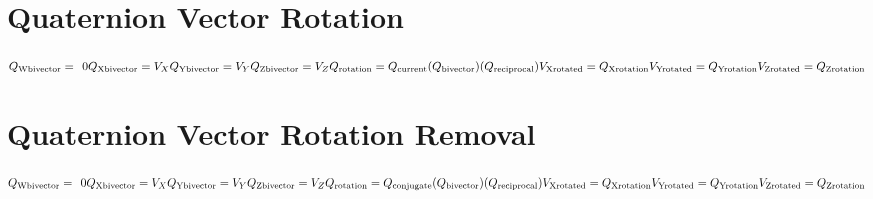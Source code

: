 \documentclass{article}
\begin{document}
\section{Quaternion Vector Rotation}
\begin{linenomath}
\begin{center}
$
Q_\textrm{Wbivector} =\hspace{1ex} 0 \newline
Q_\textrm{Xbivector} = V_X \newline
Q_\textrm{Ybivector} = V_Y \newline
Q_\textrm{Zbivector} = V_Z \newline
\newline
Q_\textrm{rotation} = Q_\textrm{current}(Q_\textrm{bivector})(Q_\textrm{reciprocal}) \newline
\newline
V_\textrm{Xrotated} = Q_\textrm{Xrotation} \newline
V_\textrm{Yrotated} = Q_\textrm{Yrotation} \newline
V_\textrm{Zrotated} = Q_\textrm{Zrotation} \newline
$
\end{center}
\end{linenomath}


\section{Quaternion Vector Rotation Removal}
\begin{linenomath}
\begin{center}
$
Q_\textrm{Wbivector} =\hspace{1ex} 0 \newline
Q_\textrm{Xbivector} = V_X \newline
Q_\textrm{Ybivector} = V_Y \newline
Q_\textrm{Zbivector} = V_Z \newline
\newline
Q_\textrm{rotation} = Q_\textrm{conjugate}(Q_\textrm{bivector})(Q_\textrm{reciprocal}) \newline
\newline
V_\textrm{Xrotated} = Q_\textrm{Xrotation} \newline
V_\textrm{Yrotated} = Q_\textrm{Yrotation} \newline
V_\textrm{Zrotated} = Q_\textrm{Zrotation} \newline
$
\end{center}
\end{linenomath}
\end{document}

